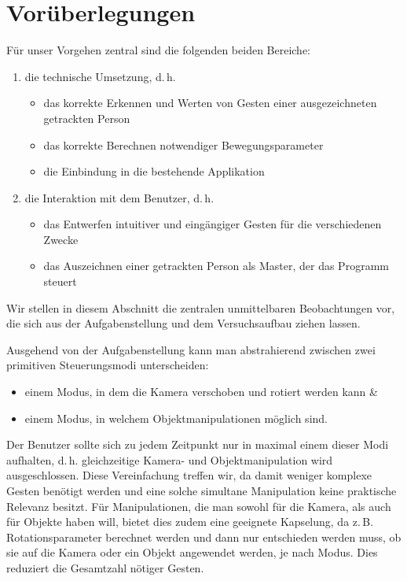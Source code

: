 \documentclass[11pt,a4paper]{scrartcl}
\begin{document}
\section{Vorüberlegungen}
	Für unser Vorgehen zentral sind die folgenden beiden Bereiche:
	\begin{enumerate}
		\item die technische Umsetzung, d.\,h.
		\begin{itemize}
		\item das korrekte Erkennen und Werten von Gesten einer ausgezeichneten getrackten Person
		\item das korrekte Berechnen notwendiger Bewegungsparameter
		\item die Einbindung in die bestehende Applikation
		\end{itemize}
		\item die Interaktion mit dem Benutzer, d.\,h.
		\begin{itemize}
		\item das Entwerfen intuitiver und eingängiger Gesten für die verschiedenen Zwecke
		\item das Auszeichnen einer getrackten Person als \glqq Master\grqq, der das Programm steuert
		\end{itemize}
	\end{enumerate}
	Wir stellen in diesem Abschnitt die zentralen unmittelbaren Beobachtungen vor, die sich aus der Aufgabenstellung und dem Versuchsaufbau ziehen lassen.\par\bigskip
	Ausgehend von der Aufgabenstellung kann man abstrahierend zwischen zwei primitiven Steuerungsmodi unterscheiden:
	\begin{itemize}
	\item einem Modus, in dem die Kamera verschoben und rotiert werden kann \&
	\item einem Modus, in welchem Objektmanipulationen möglich sind.
	\end{itemize}
	Der Benutzer sollte sich zu jedem Zeitpunkt nur in maximal einem dieser Modi aufhalten, d.\,h. gleichzeitige Kamera- und Objektmanipulation wird ausgeschlossen. Diese Vereinfachung treffen wir, da damit weniger komplexe Gesten benötigt werden und eine solche simultane Manipulation keine praktische Relevanz besitzt. Für Manipulationen, die man sowohl für die Kamera, als auch für Objekte haben will, bietet dies zudem eine geeignete Kapselung, da z.\,B. Rotationsparameter berechnet werden und dann nur entschieden werden muss, ob sie auf die Kamera oder ein Objekt angewendet werden, je nach Modus. Dies reduziert die Gesamtzahl nötiger Gesten.\par\medskip
\end{document}
